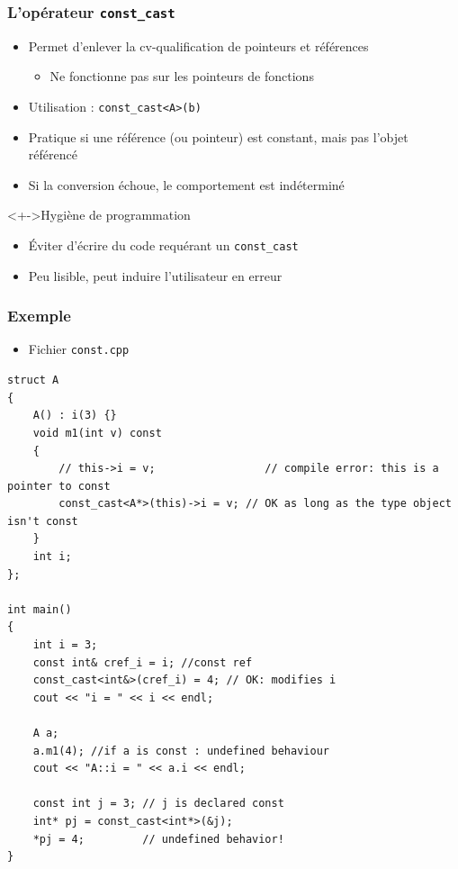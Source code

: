 \begin{frame}
\frametitle{L'opérateur \texttt{const\_cast}}
\begin{itemize}[<+->]
\item Permet d'enlever la cv-qualification de pointeurs et références
	\begin{itemize}
	\item Ne fonctionne pas sur les pointeurs de fonctions
	\end{itemize}
\item Utilisation : \lstinline|const_cast<A>(b)|
\item Pratique si une référence (ou pointeur) est constant, mais pas l'objet référencé
\item Si la conversion échoue, le comportement est indéterminé
\end{itemize}
\begin{block}<+->{Hygiène de programmation}
	\begin{itemize}[<+->]
	\item Éviter d'écrire du code requérant un \lstinline|const_cast|
	\item Peu lisible, peut induire l'utilisateur en erreur
	\end{itemize}
\end{block}
\end{frame}

\begin{frame}[containsverbatim]
\frametitle{Exemple}
\begin{itemize}
\item Fichier \texttt{const.cpp}
\end{itemize}
\begin{lstlisting}
struct A 
{
    A() : i(3) {}
    void m1(int v) const 
    {
        // this->i = v;                 // compile error: this is a pointer to const
        const_cast<A*>(this)->i = v; // OK as long as the type object isn't const
    }
    int i;
};
 
int main() 
{
    int i = 3;               
    const int& cref_i = i; //const ref
    const_cast<int&>(cref_i) = 4; // OK: modifies i
    cout << "i = " << i << endl;
 
    A a;
    a.m1(4); //if a is const : undefined behaviour
    cout << "A::i = " << a.i << endl;
 
    const int j = 3; // j is declared const
    int* pj = const_cast<int*>(&j);
    *pj = 4;         // undefined behavior!
}
\end{lstlisting}
\end{frame}


